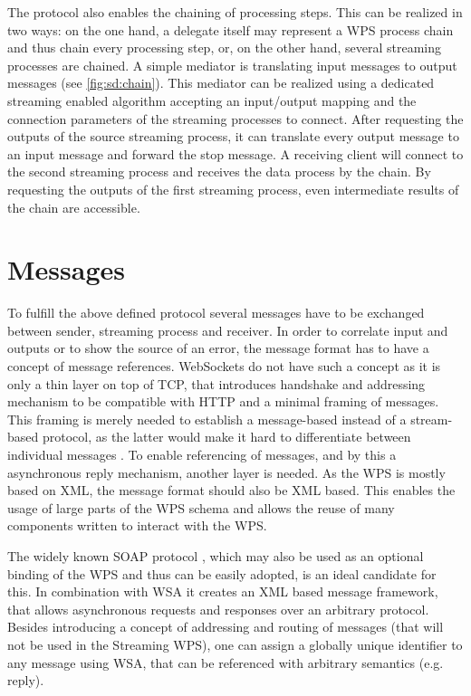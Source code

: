     The protocol also enables the chaining of processing steps. This can be realized in two ways: on the one hand, a delegate itself may represent a \ac{WPS} process chain and thus chain every processing step, or, on the other hand, several streaming processes are chained. A simple mediator is translating input messages to output messages (see \cref{fig:sd:chain}). This mediator can be realized using a dedicated streaming enabled algorithm accepting an input/output mapping and the connection parameters of the streaming processes to connect. After requesting the outputs of the source streaming process, it can translate every output message to an input message and forward the stop message. A receiving client will connect to the second streaming process and receives the data process by the chain. By requesting the outputs of the first streaming process, even intermediate results of the chain are accessible.

  \section{Messages}
    \label{sec:streaming:messages}
    To fulfill the above defined protocol several messages have to be exchanged between sender, streaming process and receiver. In order to correlate input and outputs or to show the source of an error, the message format has to have a concept of message references. WebSockets do not have such a concept as it is only a thin layer on top of TCP, that introduces handshake and addressing mechanism to be compatible with HTTP and a minimal framing of messages. This framing is merely needed to establish a message-based instead of a stream-based protocol, as the latter would make it hard to differentiate between individual messages \citep{ietf:rfc6455}. To enable referencing of messages, and by this a asynchronous reply mechanism, another layer is needed. As the \ac{WPS} is mostly based on \ac{XML}, the message format should also be \ac{XML} based. This enables the usage of large parts of the \ac{WPS} schema and allows the reuse of many components written to interact with the \ac{WPS}.

    The widely known SOAP protocol \citep{w3c:soap1}, which may also be used as an optional binding of the \ac{WPS} \citep{ogc:wps} and thus can be easily adopted, is an ideal candidate for this. In combination with \ac{WSA} \citep{w3c:wsa} it creates an \ac{XML} based message framework, that allows asynchronous requests and responses over an arbitrary protocol. Besides introducing a concept of addressing and routing of messages (that will not be used in the Streaming \ac{WPS}), one can assign a globally unique identifier to any message using \ac{WSA}, that can be referenced with arbitrary semantics (e.g. reply).

